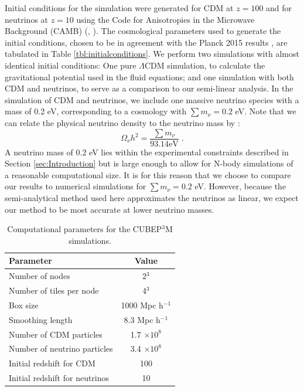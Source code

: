 \documentclass[twocolumn,superscriptaddress,prd]{revtex4}
\begin{document}
Initial conditions for the simulation were generated for CDM 
at $z=100$ and for neutrinos at $z=10$ using the Code for
Anisotropies in the Microwave Background (CAMB) (\cite{lewis99}, 
\cite{lewis13}). The cosmological parameters used to generate the initial
conditions, chosen to be in agreement with the Planck 2015 results \citep{planck15}, are tabulated in Table
\ref{tbl:initialconditions}.  
We perform two simulations with almost identical
initial conditions: One pure $\Lambda$CDM simulation, to calculate
the gravitational potential used in the fluid equations; and one
simulation with both CDM and neutrinos, to serve as a
comparison to our semi-linear analysis.  In the simulation of CDM
 and neutrinos, we include one massive neutrino
species with a mass of 0.2 eV, corresponding to a cosmology with $\sum
m_\nu = 0.2$ eV.  
Note that we can relate
the physical neutrino density to the neutrino mass by
\citep{Mangano05}:
\begin{equation}
  \Omega_\nu h^2 = \frac{ \sum m_\nu }{ 93.14 \text{eV}} \;.
\end{equation}
A neutrino mass of 0.2 eV lies within the experimental constraints described in
Section \ref{sec:Introduction} but is large enough to allow for N-body
simulations of a reasonable computational size.  It is for this
reason that we choose to compare our results to numerical simulations for $\sum m_\nu =
0.2$ eV. However, because the semi-analytical method used here approximates the
neutrinos as linear, we expect our method to be most
accurate at lower neutrino masses.   

\begin{table}[h]
\caption{Computational parameters for the CUBEP$^{3}$M simulations. }\label{tbl:initialnconditions}
\begin{center}
\begin{tabular}{lc}
\toprule
Parameter & Value \\ \hline \hline
  Number of nodes & 2$^3$ \\
 Number of tiles per node & 4$^3$ \\
Box size & 1000 Mpc h$^{-1}$ \\
Smoothing length & 8.3 Mpc h$^{-1}$ \\
Number of CDM particles & 1.7 $\times 10^{8}$\\
Number of neutrino particles & 3.4 $\times 10^{8}$\\
 Initial redshift for CDM & 100 \\
Initial redshift for neutrinos & 10 \\\bottomrule
\end{tabular}
\end{center}
\end{table}
\end{document}
